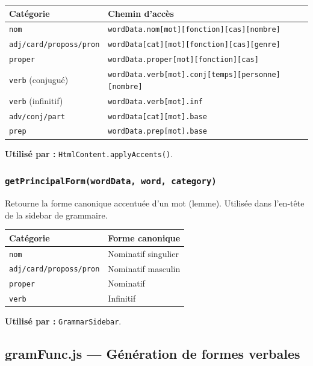 \begin{center}
\begin{tabular}{ll}
  \toprule
  \textbf{Catégorie} & \textbf{Chemin d'accès} \\
  \midrule
  \texttt{nom} & \texttt{wordData.nom[mot][fonction][cas][nombre]} \\
  \texttt{adj/card/proposs/pron} & \texttt{wordData[cat][mot][fonction][cas][genre]} \\
  \texttt{proper} & \texttt{wordData.proper[mot][fonction][cas]} \\
  \texttt{verb} (conjugué) & \texttt{wordData.verb[mot].conj[temps][personne][nombre]} \\
  \texttt{verb} (infinitif) & \texttt{wordData.verb[mot].inf} \\
  \texttt{adv/conj/part} & \texttt{wordData[cat][mot].base} \\
  \texttt{prep} & \texttt{wordData.prep[mot].base} \\
  \bottomrule
\end{tabular}
\end{center}

\textbf{Utilisé par :} \texttt{HtmlContent.applyAccents()}.

\subsubsection{\texttt{getPrincipalForm(wordData, word, category)}}

Retourne la forme canonique accentuée d'un mot (lemme). Utilisée dans l'en-tête de la sidebar de grammaire.

\begin{center}
\begin{tabular}{ll}
  \toprule
  \textbf{Catégorie} & \textbf{Forme canonique} \\
  \midrule
  \texttt{nom} & Nominatif singulier \\
  \texttt{adj/card/proposs/pron} & Nominatif masculin \\
  \texttt{proper} & Nominatif \\
  \texttt{verb} & Infinitif \\
  \bottomrule
\end{tabular}
\end{center}

\textbf{Utilisé par :} \texttt{GrammarSidebar}.

\subsection{gramFunc.js --- Génération de formes verbales}

